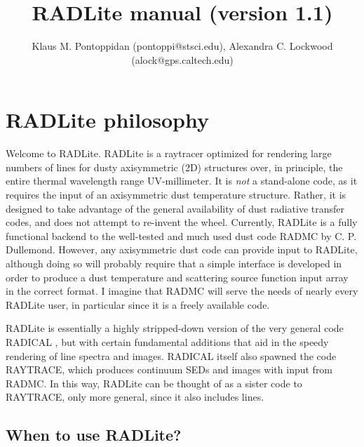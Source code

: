 \documentclass[11pt]{article}
\begin{document}
\title{RADLite manual (version 1.1)}
\author{Klaus M. Pontoppidan (pontoppi@stsci.edu), Alexandra C. Lockwood (alock@gps.caltech.edu)}

\maketitle

\section{RADLite philosophy}

Welcome to RADLite. RADLite is a raytracer optimized for rendering large numbers of lines for dusty axisymmetric (2D) structures over, in principle, the entire
thermal wavelength range UV-millimeter.  It is {\it not} a stand-alone code, as it requires the input of an axisymmetric dust temperature structure. 
Rather, it is designed to take advantage of the general availability of dust radiative transfer codes, and does not attempt to re-invent the wheel. 
Currently, RADLite is a fully functional backend to the well-tested and much used dust code RADMC by C. P. Dullemond. However, any axisymmetric 
dust code can provide input to RADLite, although doing so will probably require that a simple interface is developed in order to produce a dust temperature and scattering source function input array in the correct format. I imagine that RADMC will serve the needs of nearly every RADLite user, in particular since it is a freely available code. 

RADLite is essentially a highly stripped-down version of the very general code RADICAL \citep{Dullemond00}, but with certain fundamental
additions that aid in the speedy rendering of line spectra and images. RADICAL itself also spawned the code RAYTRACE, which produces
continuum SEDs and images with input from RADMC. In this way, RADLite can be thought of as a sister code to RAYTRACE, only more general, since it
also includes lines.  

\subsection{When to use RADLite?}
\end{document}
